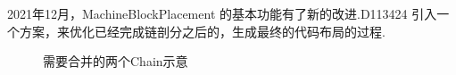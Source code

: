 2021年12月，MachineBlockPlacement 的基本功能有了新的改进.D113424\cite{llvmexttspbbl2021} 引入一个方案，来优化已经完成链剖分之后的，生成最终的代码布局的过程.

\begin{figure}
    \centering
    
    \caption{需要合并的两个Chain示意}
\end{figure}



